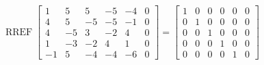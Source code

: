 \begin{exerciseAnswer} 


\[\operatorname{RREF} \left[\begin{array}{ccccc|c}
1 & 5 & 5 & -5 & -4 & 0 \\
4 & 5 & -5 & -5 & -1 & 0 \\
4 & -5 & 3 & -2 & 4 & 0 \\
1 & -3 & -2 & 4 & 1 & 0 \\
-1 & 5 & -4 & -4 & -6 & 0
\end{array}\right] = \left[\begin{array}{ccccc|c}
1 & 0 & 0 & 0 & 0 & 0 \\
0 & 1 & 0 & 0 & 0 & 0 \\
0 & 0 & 1 & 0 & 0 & 0 \\
0 & 0 & 0 & 1 & 0 & 0 \\
0 & 0 & 0 & 0 & 1 & 0
\end{array}\right] \]



\end{exerciseAnswer}
